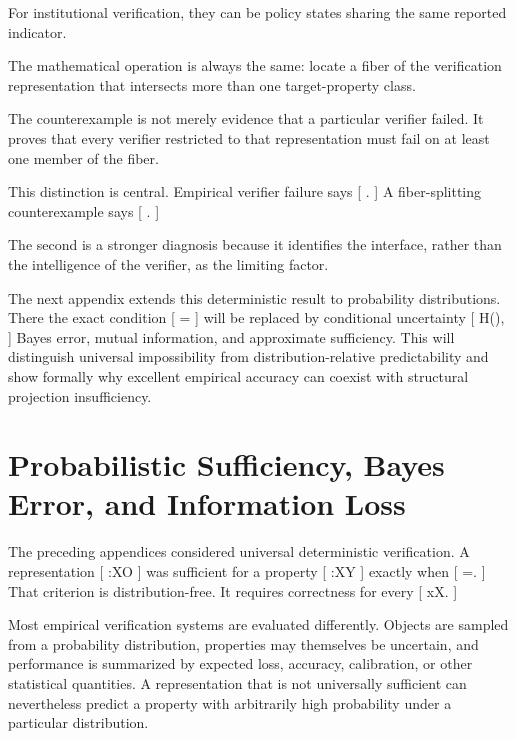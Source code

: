 \documentclass[11pt]{article}
\begin{document}
For institutional verification, they can be policy states sharing the same reported indicator.

The mathematical operation is always the same: locate a fiber of the verification representation that intersects more than one target-property class.

The counterexample is not merely evidence that a particular verifier failed. It proves that every verifier restricted to that representation must fail on at least one member of the fiber.

This distinction is central. Empirical verifier failure says
[
.
]
A fiber-splitting counterexample says
[
.
]

The second is a stronger diagnosis because it identifies the interface, rather than the intelligence of the verifier, as the limiting factor.

The next appendix extends this deterministic result to probability distributions. There the exact condition
[
\Phi=\widehat{\Phi}\circ\pi
]
will be replaced by conditional uncertainty
[
H(\Phi\mid\pi),
]
Bayes error, mutual information, and approximate sufficiency. This will distinguish universal impossibility from distribution-relative predictability and show formally why excellent empirical accuracy can coexist with structural projection insufficiency.

\section{Probabilistic Sufficiency, Bayes Error, and Information Loss}
\label{app:probabilistic}

The preceding appendices considered universal deterministic verification. A representation
[
\pi:\mathcal X\to\mathcal O
]
was sufficient for a property
[
\Phi:\mathcal X\to\mathcal Y
]
exactly when
[
\Phi=\widehat{\Phi}\circ\pi.
]
That criterion is distribution-free. It requires correctness for every
[
x\in\mathcal X.
]

Most empirical verification systems are evaluated differently. Objects are sampled from a probability distribution, properties may themselves be uncertain, and performance is summarized by expected loss, accuracy, calibration, or other statistical quantities. A representation that is not universally sufficient can nevertheless predict a property with arbitrarily high probability under a particular distribution.
\end{document}
